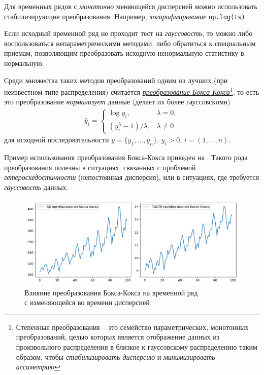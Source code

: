 \documentclass[%
	11pt,
	a4paper,
	utf8,
		]{article}
\begin{document}
Для временных рядов с \emph{монотонно} меняющейся дисперсией можно использовать стабилизирующие преобразования. Например, \emph{логарифмирование} \lstinline{np.log(ts)}.

Если исходный временной ряд не проходит тест на \emph{гауссовость}, то можно либо воспользоваться непараметрическими методами, либо обратиться к специальным приемам, позволяющим преобразовать исходную ненормальную статистику в нормальную.

Среди множества таких методов преобразований одним из лучших (при неизвестном типе распределения) считается \href{http://www.machinelearning.ru/wiki/index.php?title=Метод_Бокса-Кокса}{\itshape преобразование Бокса-Кокса}\footnote{Степенные преобразования -- это семейство параметрических, монотонных преобразований, целью которых является отображение данных из произвольного распределения в близкое к гауссовскому распределению таким образом, чтобы \emph{стабилизировать дисперсию} и \emph{минимизировать ассиметрию}}, то есть это преобразование \emph{нормализует} данные (делает их более гауссовскими)
\begin{align*}
	\hat{y}_i =
	\begin{cases}
		\log y_i, &\lambda = 0,\\
		(y_i^\lambda - 1)/\lambda, &\lambda \neq 0
	\end{cases}
\end{align*}
для исходной последовательности $ y = \{y_1, \dots, y_n\}, \,y_i > 0,\, i = (1, \dots, n) $.

Пример использования преобразования Бокса-Кокса приведен на . Такого рода преобразования полезны в ситуациях, связанных с проблемой \emph{гетероскедостичности} (непостоянная дисперсия), или в ситуациях, где требуется \emph{гауссовость} данных.

\begin{figure}[h]
	\centering
	\includegraphics[scale=0.70]{figures/boxcox.pdf}
	\caption{Влияние преобразования Бокса-Кокса на временной ряд\\с изменяющейся во времени дисперсией}\label{fig:boxcox}
\end{figure}
\end{document}
